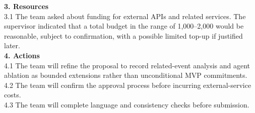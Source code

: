 \textbf{3. Resources} \\
3.1 The team asked about funding for external APIs and related services. The supervisor indicated that a total budget in the range of 1,000--2,000 would be reasonable, subject to confirmation, with a possible limited top-up if justified later. \\

\textbf{4. Actions} \\
4.1 The team will refine the proposal to record related-event analysis and agent ablation as bounded extensions rather than unconditional MVP commitments. \\
4.2 The team will confirm the approval process before incurring external-service costs. \\
4.3 The team will complete language and consistency checks before submission.
